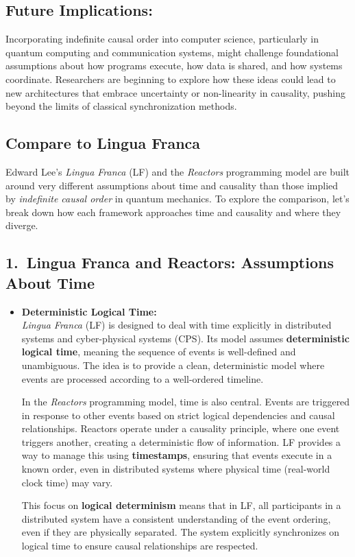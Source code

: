 \subsection*{Future Implications:}

Incorporating indefinite causal order into computer science, particularly in quantum computing and communication systems, might challenge foundational assumptions about how programs execute, how data is shared, and how systems coordinate. Researchers are beginning to explore how these ideas could lead to new architectures that embrace uncertainty or non-linearity in causality, pushing beyond the limits of classical synchronization methods.

\subsection{Compare to Lingua Franca}

Edward Lee’s \emph{Lingua Franca} (LF) and the \emph{Reactors} programming model are built around very different assumptions about time and causality than those implied by \emph{indefinite causal order} in quantum mechanics. To explore the comparison, let’s break down how each framework approaches time and causality and where they diverge.

\subsection*{1.\ Lingua Franca and Reactors: Assumptions About Time}

\begin{itemize}[leftmargin=1.5em]
\item \textbf{Deterministic Logical Time:}\\
  \emph{Lingua Franca} (LF) is designed to deal with time explicitly in distributed systems and cyber-physical systems (CPS). Its model assumes \textbf{deterministic logical time}, meaning the sequence of events is well-defined and unambiguous. The idea is to provide a clean, deterministic model where events are processed according to a well-ordered timeline.

  In the \emph{Reactors} programming model, time is also central. Events are triggered in response to other events based on strict logical dependencies and causal relationships. Reactors operate under a causality principle, where one event triggers another, creating a deterministic flow of information. LF provides a way to manage this using \textbf{timestamps}, ensuring that events execute in a known order, even in distributed systems where physical time (real-world clock time) may vary.

  This focus on \textbf{logical determinism} means that in LF, all participants in a distributed system have a consistent understanding of the event ordering, even if they are physically separated. The system explicitly synchronizes on logical time to ensure causal relationships are respected.
\end{itemize}

